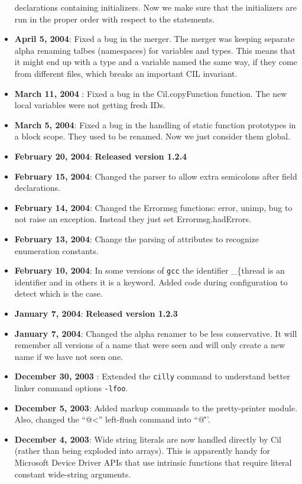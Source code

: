 \documentclass{article}
\def\t#1{{\tt #1}}
\begin{document}
\begin{itemize}
declarations containing initializers. Now we make sure that the initializers
are run in the proper order with respect to the statements.
\item {\bf April 5, 2004}: Fixed a bug in the merger. The merger was keeping
separate alpha renaming talbes (namespaces) for variables and types. This
means that it might end up with a type and a variable named the same way, if
they come from different files, which breaks an important CIL invariant.
\item {\bf March 11, 2004} : Fixed a bug in the Cil.copyFunction function. The
new local variables were not getting fresh IDs. 
\item {\bf March 5, 2004}: Fixed a bug in the handling of static function
  prototypes in a block scope. They used to be renamed. Now we just consider
  them global. 
\item {\bf February 20, 2004}: {\bf Released version 1.2.4}
\item {\bf February 15, 2004}: Changed the parser to allow extra semicolons
  after field declarations.
\item {\bf February 14, 2004}: Changed the Errormsg functions: error, unimp,
bug to not raise an exception. Instead they just set Errormsg.hadErrors. 
\item {\bf February 13, 2004}: Change the parsing of attributes to recognize
  enumeration constants.
\item {\bf February 10, 2004}: In some versions of \t{gcc} the identifier
  {\_\{thread} is an identifier and in others it is a keyword. Added code
  during configuration to detect which is the case. 
\item {\bf January 7, 2004}: {\bf Released version 1.2.3}
\item {\bf January 7, 2004}: Changed the alpha renamer to be less
conservative. It will remember all versions of a name that were seen and will
only create a new name if we have not seen one. 
\item {\bf December 30, 2003} : Extended the \t{cilly} command to understand
  better linker command options \t{-lfoo}. 
\item {\bf December 5, 2003}: Added markup commands to the pretty-printer
module. Also, changed the ``@<'' left-flush command into ``@\^''.
\item {\bf December 4, 2003}: Wide string literals are now handled
directly by Cil (rather than being exploded into arrays). This is
apparently handy for Microsoft Device Driver APIs that use intrinsic
functions that require literal constant wide-string arguments. 

\end{itemize}
\end{document}
